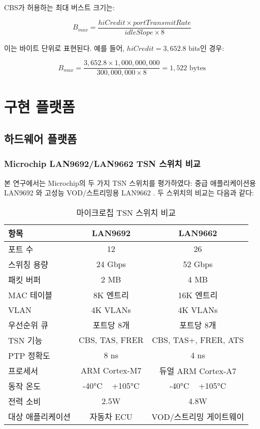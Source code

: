 \documentclass[twocolumn,10pt]{article}
\begin{document}
CBS가 허용하는 최대 버스트 크기는:

\begin{equation}
B_{max} = \frac{hiCredit \times portTransmitRate}{idleSlope \times 8}
\end{equation}

이는 바이트 단위로 표현된다. 예를 들어, $hiCredit = 3,652.8$ bits인 경우:

\begin{equation}
B_{max} = \frac{3,652.8 \times 1,000,000,000}{300,000,000 \times 8} = 1,522 \text{ bytes}
\end{equation}

\section{구현 플랫폼}
\label{sec:implementation}

\subsection{하드웨어 플랫폼}

\subsubsection{Microchip LAN9692/LAN9662 TSN 스위치 비교}

본 연구에서는 Microchip의 두 가지 TSN 스위치를 평가하였다: 중급 애플리케이션용 LAN9692 \cite{microchip2024lan9692}와 고성능 VOD/스트리밍용 LAN9662 \cite{microchip2024lan9662}. 두 스위치의 비교는 다음과 같다:

\begin{table}[h]
\centering
\caption{마이크로칩 TSN 스위치 비교}
\label{tab:microchip_switch_compare}
\begin{tabular}{lcc}
\toprule
\textbf{항목} & \textbf{LAN9692} & \textbf{LAN9662} \\
\midrule
포트 수 & 12 & 26 \\
스위칭 용량 & 24 Gbps & 52 Gbps \\
패킷 버퍼 & 2 MB & 4 MB \\
MAC 테이블 & 8K 엔트리 & 16K 엔트리 \\
VLAN & 4K VLANs & 4K VLANs \\
우선순위 큐 & 포트당 8개 & 포트당 8개 \\
TSN 기능 & CBS, TAS, FRER & CBS, TAS+, FRER, ATS \\
PTP 정확도 & 8 ns & 4 ns \\
프로세서 & ARM Cortex-M7 & 듀얼 ARM Cortex-A7 \\
동작 온도 & -40°C ~ +105°C & -40°C ~ +105°C \\
전력 소비 & 2.5W & 4.8W \\
대상 애플리케이션 & 자동차 ECU & VOD/스트리밍 게이트웨이 \\
\bottomrule
\end{tabular}
\end{table}
\end{document}

